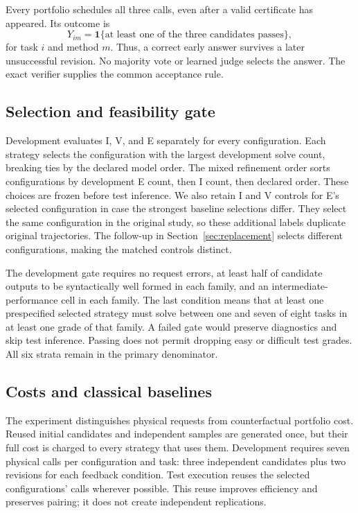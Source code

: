 Every portfolio schedules all three calls, even after a valid certificate has appeared. Its outcome is
\begin{equation}
Y_{im}=\mathbf{1}\{\text{at least one of the three candidates passes}\},
\label{eq:outcome}
\end{equation}
for task $i$ and method $m$. Thus, a correct early answer survives a later unsuccessful revision. No majority vote or learned judge selects the answer. The exact verifier supplies the common acceptance rule.

\subsection{Selection and feasibility gate}

Development evaluates I, V, and E separately for every configuration. Each strategy selects the configuration with the largest development solve count, breaking ties by the declared model order. The mixed refinement order sorts configurations by development E count, then I count, then declared order. These choices are frozen before test inference. We also retain I and V controls for E's selected configuration in case the strongest baseline selections differ. They select the same configuration in the original study, so these additional labels duplicate original trajectories. The follow-up in Section~\ref{sec:replacement} selects different configurations, making the matched controls distinct.

The development gate requires no request errors, at least half of candidate outputs to be syntactically well formed in each family, and an intermediate-performance cell in each family. The last condition means that at least one prespecified selected strategy must solve between one and seven of eight tasks in at least one grade of that family. A failed gate would preserve diagnostics and skip test inference. Passing does not permit dropping easy or difficult test grades. All six strata remain in the primary denominator.

\subsection{Costs and classical baselines}

The experiment distinguishes physical requests from counterfactual portfolio cost. Reused initial candidates and independent samples are generated once, but their full cost is charged to every strategy that uses them. Development requires seven physical calls per configuration and task: three independent candidates plus two revisions for each feedback condition. Test execution reuses the selected configurations' calls wherever possible. This reuse improves efficiency and preserves pairing; it does not create independent replications.

